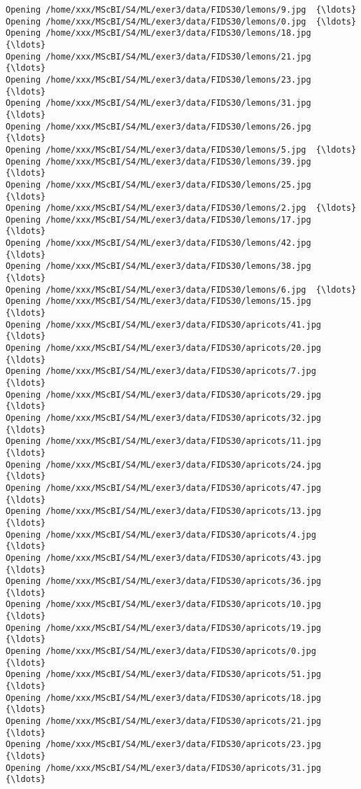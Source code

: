 \documentclass[11pt]{article}
\begin{document}
\begin{Verbatim}[commandchars=\\\{\}]
Opening /home/xxx/MScBI/S4/ML/exer3/data/FIDS30/lemons/9.jpg  {\ldots}
Opening /home/xxx/MScBI/S4/ML/exer3/data/FIDS30/lemons/0.jpg  {\ldots}
Opening /home/xxx/MScBI/S4/ML/exer3/data/FIDS30/lemons/18.jpg  {\ldots}
Opening /home/xxx/MScBI/S4/ML/exer3/data/FIDS30/lemons/21.jpg  {\ldots}
Opening /home/xxx/MScBI/S4/ML/exer3/data/FIDS30/lemons/23.jpg  {\ldots}
Opening /home/xxx/MScBI/S4/ML/exer3/data/FIDS30/lemons/31.jpg  {\ldots}
Opening /home/xxx/MScBI/S4/ML/exer3/data/FIDS30/lemons/26.jpg  {\ldots}
Opening /home/xxx/MScBI/S4/ML/exer3/data/FIDS30/lemons/5.jpg  {\ldots}
Opening /home/xxx/MScBI/S4/ML/exer3/data/FIDS30/lemons/39.jpg  {\ldots}
Opening /home/xxx/MScBI/S4/ML/exer3/data/FIDS30/lemons/25.jpg  {\ldots}
Opening /home/xxx/MScBI/S4/ML/exer3/data/FIDS30/lemons/2.jpg  {\ldots}
Opening /home/xxx/MScBI/S4/ML/exer3/data/FIDS30/lemons/17.jpg  {\ldots}
Opening /home/xxx/MScBI/S4/ML/exer3/data/FIDS30/lemons/42.jpg  {\ldots}
Opening /home/xxx/MScBI/S4/ML/exer3/data/FIDS30/lemons/38.jpg  {\ldots}
Opening /home/xxx/MScBI/S4/ML/exer3/data/FIDS30/lemons/6.jpg  {\ldots}
Opening /home/xxx/MScBI/S4/ML/exer3/data/FIDS30/lemons/15.jpg  {\ldots}
Opening /home/xxx/MScBI/S4/ML/exer3/data/FIDS30/apricots/41.jpg  {\ldots}
Opening /home/xxx/MScBI/S4/ML/exer3/data/FIDS30/apricots/20.jpg  {\ldots}
Opening /home/xxx/MScBI/S4/ML/exer3/data/FIDS30/apricots/7.jpg  {\ldots}
Opening /home/xxx/MScBI/S4/ML/exer3/data/FIDS30/apricots/29.jpg  {\ldots}
Opening /home/xxx/MScBI/S4/ML/exer3/data/FIDS30/apricots/32.jpg  {\ldots}
Opening /home/xxx/MScBI/S4/ML/exer3/data/FIDS30/apricots/11.jpg  {\ldots}
Opening /home/xxx/MScBI/S4/ML/exer3/data/FIDS30/apricots/24.jpg  {\ldots}
Opening /home/xxx/MScBI/S4/ML/exer3/data/FIDS30/apricots/47.jpg  {\ldots}
Opening /home/xxx/MScBI/S4/ML/exer3/data/FIDS30/apricots/13.jpg  {\ldots}
Opening /home/xxx/MScBI/S4/ML/exer3/data/FIDS30/apricots/4.jpg  {\ldots}
Opening /home/xxx/MScBI/S4/ML/exer3/data/FIDS30/apricots/43.jpg  {\ldots}
Opening /home/xxx/MScBI/S4/ML/exer3/data/FIDS30/apricots/36.jpg  {\ldots}
Opening /home/xxx/MScBI/S4/ML/exer3/data/FIDS30/apricots/10.jpg  {\ldots}
Opening /home/xxx/MScBI/S4/ML/exer3/data/FIDS30/apricots/19.jpg  {\ldots}
Opening /home/xxx/MScBI/S4/ML/exer3/data/FIDS30/apricots/0.jpg  {\ldots}
Opening /home/xxx/MScBI/S4/ML/exer3/data/FIDS30/apricots/51.jpg  {\ldots}
Opening /home/xxx/MScBI/S4/ML/exer3/data/FIDS30/apricots/18.jpg  {\ldots}
Opening /home/xxx/MScBI/S4/ML/exer3/data/FIDS30/apricots/21.jpg  {\ldots}
Opening /home/xxx/MScBI/S4/ML/exer3/data/FIDS30/apricots/23.jpg  {\ldots}
Opening /home/xxx/MScBI/S4/ML/exer3/data/FIDS30/apricots/31.jpg  {\ldots}

\end{Verbatim}
\end{document}
